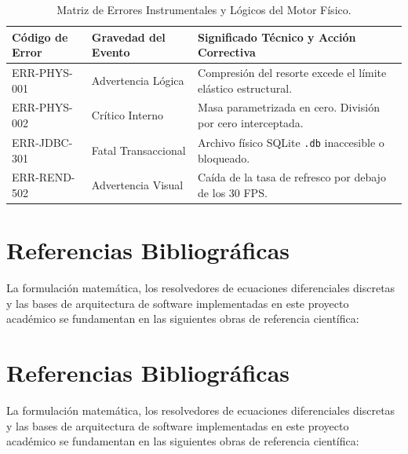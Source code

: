 \documentclass[11pt,a4paper]{article}
\begin{document}
	\begin{table}[htbp]
		\centering
		\caption{Matriz de Errores Instrumentales y Lógicos del Motor Físico.}
		\begin{tabular}{lll}
			\toprule
			\textbf{Código de Error} & \textbf{Gravedad del Evento} & \textbf{Significado Técnico y Acción Correctiva} \\
			\midrule
			ERR-PHYS-001 & Advertencia Lógica & Compresión del resorte excede el límite elástico estructural. \\
			ERR-PHYS-002 & Crítico Interno & Masa parametrizada en cero. División por cero interceptada. \\
			ERR-JDBC-301 & Fatal Transaccional & Archivo físico SQLite \texttt{.db} inaccesible o bloqueado. \\
			ERR-REND-502 & Advertencia Visual & Caída de la tasa de refresco por debajo de los 30 FPS. \\
			\bottomrule
		\end{tabular}
		\label{tab:errores_sistema}
	\end{table}
	
	\section{Referencias Bibliográficas}
	La formulación matemática, los resolvedores de ecuaciones diferenciales discretas y las bases de arquitectura de software implementadas en este proyecto académico se fundamentan en las siguientes obras de referencia científica:
	
	\section{Referencias Bibliográficas}
	La formulación matemática, los resolvedores de ecuaciones diferenciales discretas y las bases de arquitectura de software implementadas en este proyecto académico se fundamentan en las siguientes obras de referencia científica:
	
\end{document}
